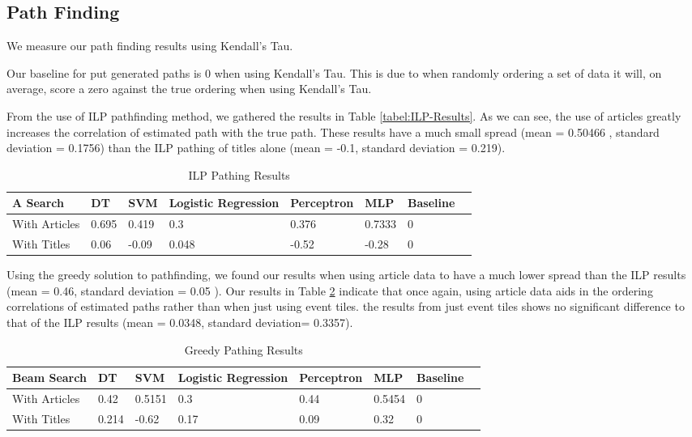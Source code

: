 \documentclass[bsc,frontabs,twoside,singlespacing,parskip,deptreport]{infthesis}     %
\begin{document}
\subsection{Path Finding}
We measure our path finding results using Kendall's Tau.

Our baseline for put generated paths is 0 when using Kendall's Tau.
This is due to when randomly ordering a set of data it will, on average, score a zero against the true ordering
when using Kendall's Tau.


From the use of ILP pathfinding method, we gathered the results in Table \ref{tabel:ILP-Results}.
As we can see, the use of articles greatly increases the correlation of estimated path with the true path.
These results have a much small spread (mean = 0.50466 , standard deviation = 0.1756) than the ILP pathing of titles alone
(mean = -0.1, standard deviation = 0.219).

\begin{table}[H]
\centering
\label{table:ILP-results}
\begin{tabular}{|l|l|l|l|l|l|l|l|}
  \hline
  A\* Search & DT & SVM &Logistic Regression & Perceptron & MLP & Baseline\\
  \hline
With Articles & 0.695 & 0.419 & 0.3 & 0.376   & 0.7333  & 0\\
\hline
With Titles &0.06  & -0.09 & 0.048 & -0.52  & -0.28 & 0\\
\hline
\end{tabular}
\caption{ILP Pathing Results}
\end{table}

Using the greedy solution to pathfinding, we found our results when using article data to have a much lower spread
than the ILP results (mean = 0.46, standard deviation = 0.05 ). Our results in Table \ref{table:greedy-results} indicate that once
again, using article data aids in the ordering correlations of estimated paths rather than when just using event tiles.
the results from just event tiles shows no significant difference to that of the ILP results
(mean = 0.0348, standard deviation= 0.3357).

\begin{table}[H]
\centering
\label{table:greedy-results}
\begin{tabular}{|l|l|l|l|l|l|l|l|}
  \hline
  Beam Search & DT & SVM &Logistic Regression & Perceptron & MLP & Baseline\\
  \hline
With Articles & 0.42 & 0.5151 & 0.3 &  0.44  & 0.5454  & 0\\
\hline
With Titles & 0.214 & -0.62 & 0.17 & 0.09  & 0.32 & 0\\
\hline
\end{tabular}
\caption{Greedy Pathing Results}
\end{table}
\end{document}

